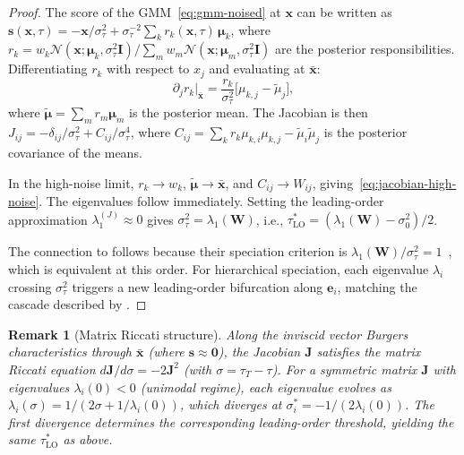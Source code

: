 \documentclass[11pt]{article}
\newtheorem{remark}[theorem]{Remark}
\begin{document}
\begin{proof}
The score of the GMM~\eqref{eq:gmm-noised} at $\bm{x}$ can be written as
$\bm{s}(\bm{x},\tau) = -\bm{x}/\sigma_\tau^2 + \sigma_\tau^{-2}\sum_k r_k(\bm{x},\tau)\,\bm{\mu}_k$,
where $r_k = w_k\mathcal{N}(\bm{x};\bm{\mu}_k,\sigma_\tau^2\bm{I})/\sum_m w_m\mathcal{N}(\bm{x};\bm{\mu}_m,\sigma_\tau^2\bm{I})$ are the posterior responsibilities.
Differentiating $r_k$ with respect to $x_j$ and evaluating at $\bar{\bm{x}}$:
\[
  \partial_j r_k\big|_{\bar{\bm{x}}} = \frac{r_k}{\sigma_\tau^2}\bigl[\mu_{k,j} - \tilde{\mu}_j\bigr],
\]
where $\tilde{\bm{\mu}} = \sum_m r_m \bm{\mu}_m$ is the posterior mean.
The Jacobian is then $J_{ij} = -\delta_{ij}/\sigma_\tau^2 + C_{ij}/\sigma_\tau^4$, where $C_{ij} = \sum_k r_k \mu_{k,i}\mu_{k,j} - \tilde{\mu}_i\tilde{\mu}_j$ is the posterior covariance of the means.

In the high-noise limit, $r_k \to w_k$, $\tilde{\bm{\mu}} \to \bar{\bm{x}}$, and $C_{ij} \to W_{ij}$, giving~\eqref{eq:jacobian-high-noise}.
The eigenvalues follow immediately.
Setting the leading-order approximation $\lambda_1^{(J)} \approx 0$ gives $\sigma_\tau^2 = \lambda_1(\bm{W})$, i.e., $\tau^\ast_{\mathrm{LO}} = (\lambda_1(\bm{W}) - \sigma_0^2)/2$.

The connection to \citet{biroli2024dynamical} follows because their speciation criterion is $\lambda_1(\bm{W})/\sigma_\tau^2 = 1$~\citep[Eq.~(7)]{biroli2024dynamical}, which is equivalent at this order.
For hierarchical speciation, each eigenvalue $\lambda_i$ crossing $\sigma_\tau^2$ triggers a new leading-order bifurcation along $\bm{e}_i$, matching the cascade described by \citet{sclocchi2024phase}.
\end{proof}

\begin{remark}[Matrix Riccati structure]\label{rem:riccati}
Along the inviscid vector Burgers characteristics through $\bar{\bm{x}}$ (where $\bm{s} \approx \bm{0}$), the Jacobian $\bm{J}$ satisfies the matrix Riccati equation $d\bm{J}/d\sigma = -2\bm{J}^2$ (with $\sigma = \tau_T - \tau$).
For a symmetric matrix $\bm{J}$ with eigenvalues $\lambda_i(0) < 0$ (unimodal regime), each eigenvalue evolves as $\lambda_i(\sigma) = 1/(2\sigma + 1/\lambda_i(0))$, which diverges at $\sigma_i^\ast = -1/(2\lambda_i(0))$.
The first divergence determines the corresponding leading-order threshold, yielding the same $\tau^\ast_{\mathrm{LO}}$ as above.
\end{remark}


\end{document}
